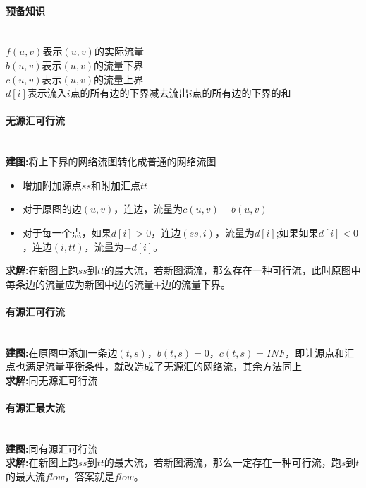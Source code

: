 \paragraph{预备知识}~{}
\\
$f(u, v)$表示$(u, v)$的实际流量\\
$b(u, v)$表示$(u, v)$的流量下界\\
$c(u, v)$表示$(u, v)$的流量上界\\
$d[i]$表示流入$i$点的所有边的下界减去流出$i$点的所有边的下界的和\\

\paragraph{无源汇可行流}~{}
\\
\textbf{建图:}将上下界的网络流图转化成普通的网络流图\\
\begin{itemize}
\item 增加附加源点$ss$和附加汇点$tt$
\item 对于原图的边$(u, v)$，连边，流量为$c(u, v)-b(u, v)$
\item 对于每一个点，如果$d[i]>0$，连边$(ss, i)$，流量为$d[i]$;如果如果$d[i]<0$，连边$(i, tt)$，流量为$-d[i]$。\\
\end{itemize}
\textbf{求解:}在新图上跑$ss$到$tt$的最大流，若新图满流，那么存在一种可行流，此时原图中每条边的流量应为新图中边的流量+边的流量下界。\\

\paragraph{有源汇可行流}~{}
\\
\textbf{建图:}在原图中添加一条边$(t, s)$，$b(t, s)=0$，$c(t, s)=INF$，即让源点和汇点也满足流量平衡条件，就改造成了无源汇的网络流，其余方法同上\\
\textbf{求解:}同无源汇可行流\\

\paragraph{有源汇最大流}~{}
\\
\textbf{建图:}同有源汇可行流\\
\textbf{求解:}在新图上跑$ss$到$tt$的最大流，若新图满流，那么一定存在一种可行流，跑$s$到$t$的最大流$flow$，答案就是$flow$。\\

